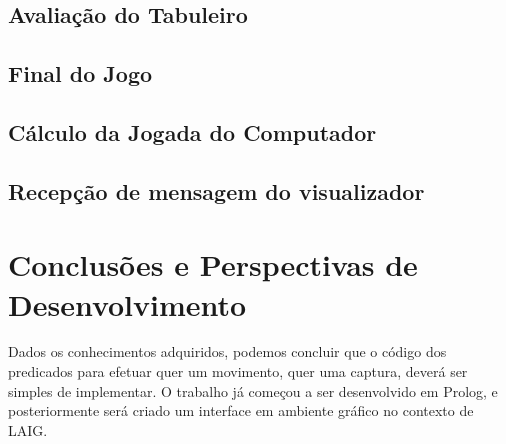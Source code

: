 \documentclass[15pt,a4paper]{article}
\begin{document}

\subsection{Avaliação do Tabuleiro}




\subsection{Final do Jogo}




\subsection{Cálculo da Jogada do Computador}




\subsection{Recepção de mensagem do visualizador}



\newpage

\section{Conclusões e Perspectivas de Desenvolvimento}


Dados os conhecimentos adquiridos, podemos concluir que o código dos predicados para efetuar quer um movimento, quer uma captura, deverá ser simples de implementar. 
O trabalho já começou a ser desenvolvido em Prolog, e posteriormente será criado um interface em ambiente gráfico no contexto de LAIG.
\end{document}
